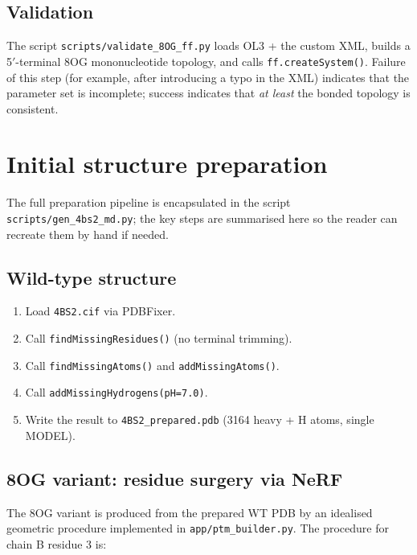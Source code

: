 \documentclass[11pt,a4paper]{article}
\begin{document}
\subsection{Validation}
The script \texttt{scripts/validate\_8OG\_ff.py} loads OL3 + the custom
XML, builds a 5$'$-terminal 8OG mononucleotide topology, and calls
\texttt{ff.createSystem()}. Failure of this step (for example, after
introducing a typo in the XML) indicates that the parameter set is
incomplete; success indicates that \emph{at least} the bonded topology
is consistent.

\section{Initial structure preparation}
\label{sec:prep}

The full preparation pipeline is encapsulated in the script
\texttt{scripts/gen\_4bs2\_md.py}; the key steps are summarised here so
the reader can recreate them by hand if needed.

\subsection{Wild-type structure}
\begin{enumerate}[leftmargin=*]
\item Load \texttt{4BS2.cif} via PDBFixer.
\item Call \texttt{findMissingResidues()} (no terminal trimming).
\item Call \texttt{findMissingAtoms()} and \texttt{addMissingAtoms()}.
\item Call \texttt{addMissingHydrogens(pH=7.0)}.
\item Write the result to \texttt{4BS2\_prepared.pdb}
(3164 heavy + H atoms, single MODEL).
\end{enumerate}

\subsection{8OG variant: residue surgery via NeRF}
\label{sec:prep:nerf}

The 8OG variant is produced from the prepared WT PDB by an idealised
geometric procedure implemented in
\texttt{app/ptm\_builder.py}. The procedure for chain B residue 3 is:
\end{document}
